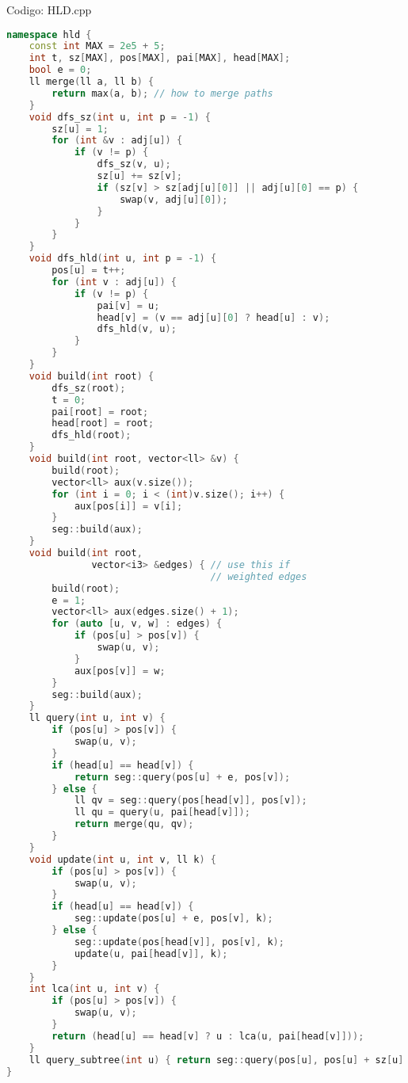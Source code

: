 \documentclass[10pt, a4paper, oneside]{book}
\begin{document}
\hfill

Codigo: HLD.cpp

\begin{lstlisting}[language=C++]
namespace hld {
    const int MAX = 2e5 + 5;
    int t, sz[MAX], pos[MAX], pai[MAX], head[MAX];
    bool e = 0;
    ll merge(ll a, ll b) {
        return max(a, b); // how to merge paths
    }
    void dfs_sz(int u, int p = -1) {
        sz[u] = 1;
        for (int &v : adj[u]) {
            if (v != p) {
                dfs_sz(v, u);
                sz[u] += sz[v];
                if (sz[v] > sz[adj[u][0]] || adj[u][0] == p) {
                    swap(v, adj[u][0]);
                }
            }
        }
    }
    void dfs_hld(int u, int p = -1) {
        pos[u] = t++;
        for (int v : adj[u]) {
            if (v != p) {
                pai[v] = u;
                head[v] = (v == adj[u][0] ? head[u] : v);
                dfs_hld(v, u);
            }
        }
    }
    void build(int root) {
        dfs_sz(root);
        t = 0;
        pai[root] = root;
        head[root] = root;
        dfs_hld(root);
    }
    void build(int root, vector<ll> &v) {
        build(root);
        vector<ll> aux(v.size());
        for (int i = 0; i < (int)v.size(); i++) {
            aux[pos[i]] = v[i];
        }
        seg::build(aux);
    }
    void build(int root,
               vector<i3> &edges) { // use this if
                                    // weighted edges
        build(root);
        e = 1;
        vector<ll> aux(edges.size() + 1);
        for (auto [u, v, w] : edges) {
            if (pos[u] > pos[v]) {
                swap(u, v);
            }
            aux[pos[v]] = w;
        }
        seg::build(aux);
    }
    ll query(int u, int v) {
        if (pos[u] > pos[v]) {
            swap(u, v);
        }
        if (head[u] == head[v]) {
            return seg::query(pos[u] + e, pos[v]);
        } else {
            ll qv = seg::query(pos[head[v]], pos[v]);
            ll qu = query(u, pai[head[v]]);
            return merge(qu, qv);
        }
    }
    void update(int u, int v, ll k) {
        if (pos[u] > pos[v]) {
            swap(u, v);
        }
        if (head[u] == head[v]) {
            seg::update(pos[u] + e, pos[v], k);
        } else {
            seg::update(pos[head[v]], pos[v], k);
            update(u, pai[head[v]], k);
        }
    }
    int lca(int u, int v) {
        if (pos[u] > pos[v]) {
            swap(u, v);
        }
        return (head[u] == head[v] ? u : lca(u, pai[head[v]]));
    }
    ll query_subtree(int u) { return seg::query(pos[u], pos[u] + sz[u] - 1); }
}
\end{lstlisting}
\hfill
\end{document}
